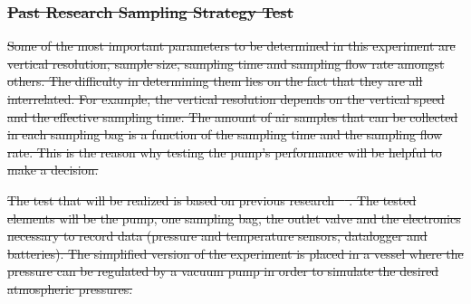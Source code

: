 \documentclass[a4paper,12pt,oneside]{article} %
\providecommand{\DIFdeltex}[1]{{\protect\color{red}\sout{#1}}}                      %
\providecommand{\DIFdelbegin}{} %
\providecommand{\DIFdelend}{} %
\providecommand{\DIFdel}[1]{\texorpdfstring{\DIFdeltex{#1}}{}} %
\newcommand{\DIFscaledelfig}{0.5}
\newlength{\DIFdelgraphicswidth} %
\newlength{\DIFdelgraphicsheight} %
\newcommand{\DIFdelincludegraphics}[2][]{%
\sbox{\DIFdelgraphicsbox}{\DIFOincludegraphics[#1]{#2}}%
\settoboxwidth{\DIFdelgraphicswidth}{\DIFdelgraphicsbox} %
\settoboxtotalheight{\DIFdelgraphicsheight}{\DIFdelgraphicsbox} %
\scalebox{\DIFscaledelfig}{%
\parbox[b]{\DIFdelgraphicswidth}{\usebox{\DIFdelgraphicsbox}\\[-\baselineskip] \rule{\DIFdelgraphicswidth}{0em}}\llap{\resizebox{\DIFdelgraphicswidth}{\DIFdelgraphicsheight}{%
\setlength{\unitlength}{\DIFdelgraphicswidth}%
\begin{picture}(1,1)%
\thicklines\linethickness{2pt} %
{\color[rgb]{1,0,0}\put(0,0){\framebox(1,1){}}}%
{\color[rgb]{1,0,0}\put(0,0){\line( 1,1){1}}}%
{\color[rgb]{1,0,0}\put(0,1){\line(1,-1){1}}}%
\end{picture}%
}\hspace*{3pt}}} %
} %
\DeclareRobustCommand{\DIFdelbegin}{\DIFOdelbegin \let\includegraphics\DIFdelincludegraphics} %
\DeclareRobustCommand{\DIFdelend}{\DIFOaddend \let\includegraphics\DIFOincludegraphics} %
\begin{document}
\begin{appendices}
\DIFdelbegin \subsubsection{\DIFdel{Past Research Sampling Strategy Test}}
\addtocounter{subsubsection}{-1}%
\DIFdel{Some of the most important parameters to be determined in this experiment are vertical resolution, sample size, sampling time and sampling flow rate amongst others. The difficulty in determining them lies on the fact that they are all interrelated. For example, the vertical resolution depends on the vertical speed and the effective sampling time. The amount of air samples that can be collected in each sampling bag is a function of the sampling time and the sampling flow rate. This is the reason why testing the pump's performance will be helpful to make a decision.
}\DIFdelend %

\DIFdelbegin %
\DIFdel{The test that will be realized is based on previous research \mbox{%
\cite{LISA}}\hspace{0pt}%
. The tested elements will be the pump, one sampling bag, the outlet valve and the electronics necessary to record data (pressure and temperature sensors, datalogger and batteries). The simplified version of the experiment is placed in a vessel where the pressure can be regulated by a vacuum pump in order to simulate the desired atmospheric pressures.
}\DIFdelend %


\end{appendices}
\end{document}
